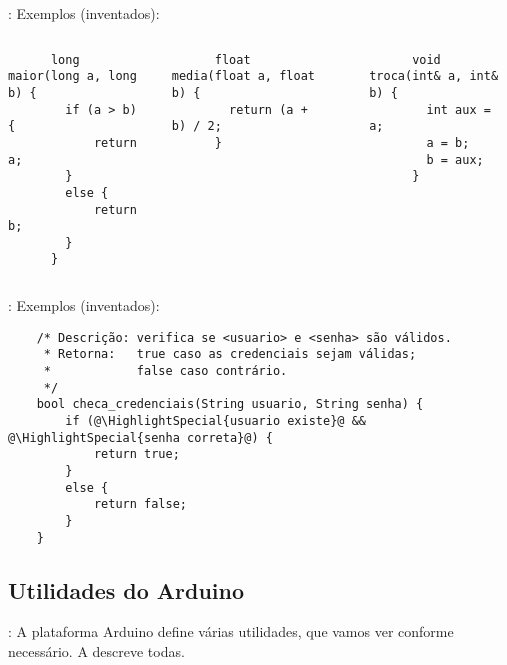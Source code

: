 \begin{frame}[fragile]{\insertsection: \insertsubsection}
  Exemplos (inventados):
  \begin{columns}[t]
    \begin{verbatim}
      long maior(long a, long b) {
      	if (a > b) {
      		return a;
      	}
      	else {
      		return b;
      	}
      }
    \end{verbatim}
    \begin{verbatim}
      float media(float a, float b) {
      	return (a + b) / 2;
      }
    \end{verbatim}
    \vspace{-\bigskipamount}\\
    \begin{verbatim}
      void troca(int& a, int& b) {
      	int aux = a;
      	a = b;
      	b = aux;
      }
    \end{verbatim}
  \end{columns}
\end{frame}


\begin{frame}[fragile]{\insertsection: \insertsubsection}
  Exemplos (inventados):
  \begin{verbatim}
    /* Descrição: verifica se <usuario> e <senha> são válidos.
     * Retorna:   true caso as credenciais sejam válidas;
     *            false caso contrário.
     */
    bool checa_credenciais(String usuario, String senha) {
    	if (@\HighlightSpecial{usuario existe}@ && @\HighlightSpecial{senha correta}@) {
    		return true;
    	}
    	else {
    		return false;
    	}
    }
  \end{verbatim}
\end{frame}


\subsection{Utilidades do Arduino}


\begin{frame}{\insertsection: \insertsubsection}
  A plataforma Arduino define várias utilidades, que vamos ver conforme necessário. A  descreve todas.
\end{frame}


